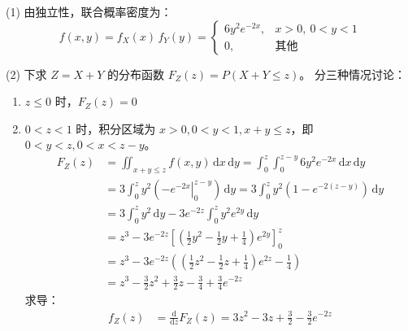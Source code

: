 ﻿\documentclass[lang=cn,11pt]{elegantbook}
\begin{document}
\begin{solution}
(1) 由独立性，联合概率密度为：
\[
f(x,y) = f_X(x)\,f_Y(y) = \begin{cases} 6y^2 e^{-2x}, & x > 0,\ 0 < y < 1 \\ 0, & \text{其他} \end{cases}
\]

(2) 下求 $Z=X+Y$ 的分布函数 $F_Z(z) = P(X+Y \leqslant z)$。
分三种情况讨论：
\begin{enumerate}
    \item $z \leqslant 0$ 时，$F_Z(z) = 0$
    \item $0 < z < 1$ 时，积分区域为 $x>0, 0<y<1, x+y \leqslant z$，即 $0 < y < z, 0 < x < z-y$。
\begin{align*}
    F_Z(z) &= \iint_{x+y\leqslant z} f(x,y) \,\mathrm{d}x\,\mathrm{d}y = \int_0^z \int_0^{z-y} 6y^2 e^{-2x} \,\mathrm{d}x\,\mathrm{d}y \\
    &= 3 \int_0^z y^2 \left( \left. -e^{-2x} \right|_0^{z-y} \right) \,\mathrm{d}y = 3 \int_0^z y^2 \left( 1 - e^{-2(z-y)} \right) \,\mathrm{d}y \\
    &= 3 \int_0^z y^2 \,\mathrm{d}y - 3e^{-2z} \int_0^z y^2 e^{2y} \,\mathrm{d}y \\
    &= z^3 - 3e^{-2z} \left[ \left( \frac{1}{2}y^2 - \frac{1}{2}y + \frac{1}{4} \right) e^{2y} \right]_0^z \\
    &= z^3 - 3e^{-2z} \left( \left( \frac{1}{2}z^2 - \frac{1}{2}z + \frac{1}{4} \right) e^{2z} - \frac{1}{4} \right) \\
    &= z^3 - \frac{3}{2}z^2 + \frac{3}{2}z - \frac{3}{4} + \frac{3}{4}e^{-2z}
\end{align*}
求导：
\begin{align*}
    f_Z(z) &= \frac{\mathrm{d}}{\mathrm{d}z} F_Z(z) = 3z^2 - 3z + \frac{3}{2} - \frac{3}{2}e^{-2z}
\end{align*}


\end{enumerate}
\end{solution}
\end{document}
